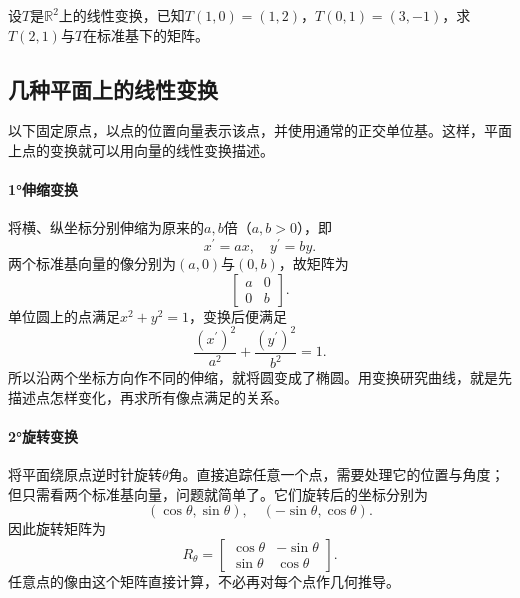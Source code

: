 \begin{example}
设\(T\)是\(\mathbb{R}^{2}\)上的线性变换，已知\(T \left( 1 , 0 \right) = \left( 1 , 2 \right)\)，\(T \left( 0 , 1 \right) = \left( 3 , - 1 \right)\)，求\(T \left( 2 , 1 \right)\)与\(T\)在标准基下的矩阵。
\end{example}

\subsection{几种平面上的线性变换}
以下固定原点，以点的位置向量表示该点，并使用通常的正交单位基。这样，平面上点的变换就可以用向量的线性变换描述。

\paragraph{1°伸缩变换} \mbox{}

将横、纵坐标分别伸缩为原来的\(a , b\)倍（\(a , b > 0\)），即
\begin{equation}
    x^{\prime} = a x , \quad y^{\prime} = b y .
\end{equation}
两个标准基向量的像分别为\(\left( a , 0 \right)\)与\(\left( 0 , b \right)\)，故矩阵为
\begin{equation}
    \left[ \begin{matrix}a & 0 \\ 0 & b\end{matrix} \right] .
\end{equation}
单位圆上的点满足\(x^{2} + y^{2} = 1\)，变换后便满足
\begin{equation}
    \frac{\left( x^{\prime} \right)^{2}}{a^{2}} + \frac{\left( y^{\prime} \right)^{2}}{b^{2}} = 1 .
\end{equation}
所以沿两个坐标方向作不同的伸缩，就将圆变成了椭圆。用变换研究曲线，就是先描述点怎样变化，再求所有像点满足的关系。

\paragraph{2°旋转变换} \mbox{}

将平面绕原点逆时针旋转\(\theta\)角。直接追踪任意一个点，需要处理它的位置与角度；但只需看两个标准基向量，问题就简单了。它们旋转后的坐标分别为
\begin{equation}
    \left( \cos \theta , \sin \theta \right) , \quad
    \left( - \sin \theta , \cos \theta \right) .
\end{equation}
因此旋转矩阵为
\begin{equation}
    R_{\theta} = \left[ \begin{matrix}
        \cos \theta & - \sin \theta \\
        \sin \theta & \cos \theta
    \end{matrix} \right] .
\end{equation}
任意点的像由这个矩阵直接计算，不必再对每个点作几何推导。

